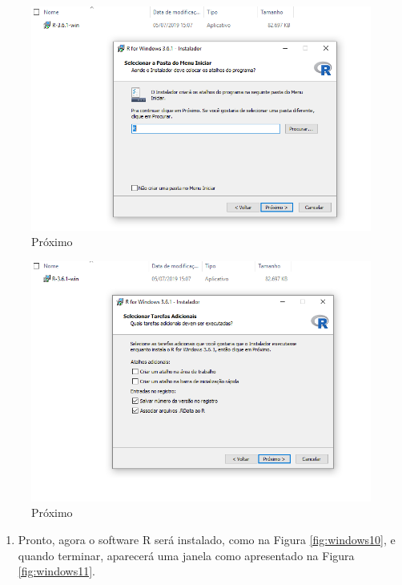 \documentclass[
]{book}
\providecommand{\tightlist}{%
  \setlength{\itemsep}{0pt}\setlength{\parskip}{0pt}}
\begin{document}
\begin{figure}
\includegraphics[width=1\linewidth]{figures/install_Windows8} \caption{\label{fig:windows8}Próximo }\label{fig:windows8}
\end{figure}

\begin{figure}
\includegraphics[width=1\linewidth]{figures/install_Windows9} \caption{\label{fig:windows9}Próximo }\label{fig:windows9}
\end{figure}

\begin{enumerate}
\def\labelenumi{\arabic{enumi})}
\setcounter{enumi}{4}
\tightlist
\item
  Pronto, agora o software R será instalado, como na Figura \ref{fig:windows10}, e quando terminar, aparecerá uma janela como apresentado na Figura \ref{fig:windows11}.
\end{enumerate}
\end{document}
